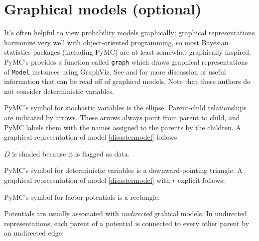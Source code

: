 \section{Graphical models (optional)}
\label{sec:graphical}

It's often helpful to view probability models graphically; graphical representations harmonize very well with object-oriented programming, so most Bayesian statistics packages (including PyMC) are at least somewhat graphically inspired. PyMC's provides a function called \texttt{graph} which draws graphical representations of \texttt{Model} instances using GraphViz. See \cite{dawidmarkov} and \cite{jordangraphical} for more discussion of useful information that can be read off of graphical models. Note that these authors do not consider deterministic variables.

PyMC's symbol for stochastic variables is the ellipse. Parent-child relationships are indicated by arrows. These arrows always point from parent to child, and PyMC labels them with the names assigned to the parents by the children. A graphical representation of model \ref{disastermodel} follows:
\begin{center}
\end{center} 
$D$ is shaded because it is flagged as data.

PyMC's symbol for deterministic variables is a downward-pointing triangle. A graphical representation of model \ref{disastermodel} with $r$ explicit follows:
\begin{center}
\end{center}

PyMC's symbol for factor potentials is a rectangle:
\begin{center}
\end{center}
Potentials are usually associated with \emph{undirected} grahical models. In undirected representations, each parent of a potential is connected to every other parent by an undirected edge:
\begin{center}
\end{center}

